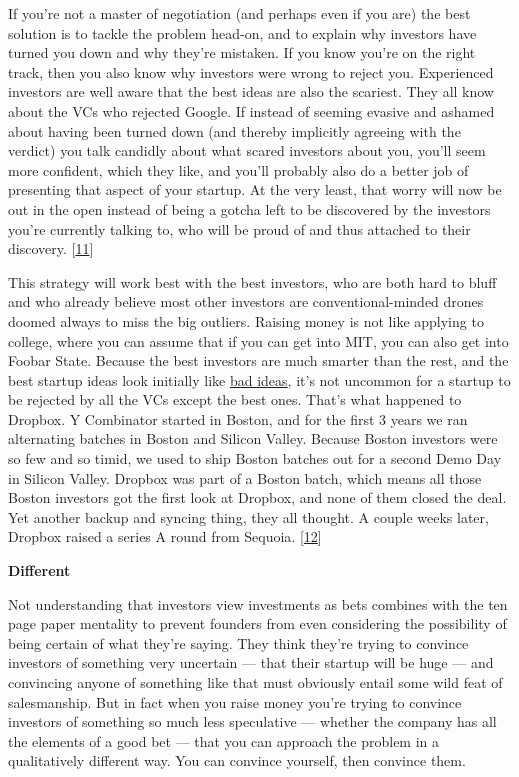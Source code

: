 If you're not a master of negotiation (and perhaps even if you are) the
best solution is to tackle the problem head-on, and to explain why
investors have turned you down and why they're mistaken. If you know
you're on the right track, then you also know why investors were wrong
to reject you. Experienced investors are well aware that the best ideas
are also the scariest. They all know about the VCs who rejected Google.
If instead of seeming evasive and ashamed about having been turned down
(and thereby implicitly agreeing with the verdict) you talk candidly
about what scared investors about you, you'll seem more confident, which
they like, and you'll probably also do a better job of presenting that
aspect of your startup. At the very least, that worry will now be out in
the open instead of being a gotcha left to be discovered by the
investors you're currently talking to, who will be proud of and thus
attached to their discovery. {[}\hyperref[f11n]{11}{]}

This strategy will work best with the best investors, who are both hard
to bluff and who already believe most other investors are
conventional-minded drones doomed always to miss the big outliers.
Raising money is not like applying to college, where you can assume that
if you can get into MIT, you can also get into Foobar State. Because the
best investors are much smarter than the rest, and the best startup
ideas look initially like \href{startupideas.html}{bad ideas}, it's not
uncommon for a startup to be rejected by all the VCs except the best
ones. That's what happened to Dropbox. Y Combinator started in Boston,
and for the first 3 years we ran alternating batches in Boston and
Silicon Valley. Because Boston investors were so few and so timid, we
used to ship Boston batches out for a second Demo Day in Silicon Valley.
Dropbox was part of a Boston batch, which means all those Boston
investors got the first look at Dropbox, and none of them closed the
deal. Yet another backup and syncing thing, they all thought. A couple
weeks later, Dropbox raised a series A round from Sequoia.
{[}\hyperref[f12n]{12}{]}

\textbf{Different}

Not understanding that investors view investments as bets combines with
the ten page paper mentality to prevent founders from even considering
the possibility of being certain of what they're saying. They think
they're trying to convince investors of something very uncertain ---
that their startup will be huge --- and convincing anyone of something
like that must obviously entail some wild feat of salesmanship. But in
fact when you raise money you're trying to convince investors of
something so much less speculative --- whether the company has all the
elements of a good bet --- that you can approach the problem in a
qualitatively different way. You can convince yourself, then convince
them.

